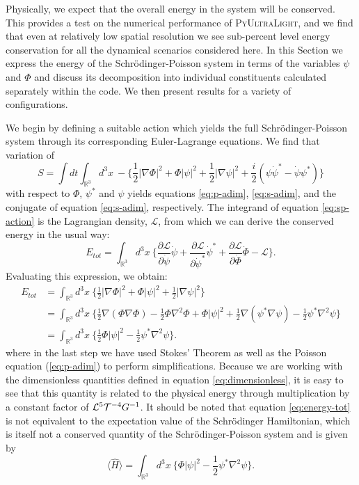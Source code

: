 \documentclass[a4paper,11pt]{article}
\newcommand{\PyUltraLight}{\textsc{PyUltraLight}\xspace}
\begin{document}
Physically, we expect that the overall energy in the system will be conserved. This provides a test on the numerical performance of \PyUltraLight, and we find that even at relatively low spatial resolution we see sub-percent level energy conservation for all the dynamical scenarios considered here. In this Section we express the energy of the Schr{\"o}dinger-Poisson system in terms of the variables  $\psi$ and $\Phi$ and discuss its decomposition into individual constituents calculated separately within the code. We then present results for a variety of configurations. 

We begin by defining a suitable action which yields the full Schr{\"o}dinger-Poisson system through its corresponding Euler-Lagrange equations. We find that variation of
\begin{equation}\label{eq:sp-action}
    S=\int dt\int_{\mathbb{R}^3} d^3x \  -\bigg\{\frac{1}{2}\vert\nabla\Phi\vert^2+\Phi\vert\psi\vert^2+\frac{1}{2}\vert\nabla\psi\vert^2+\frac{i}{2}(\psi\Dot{\psi}^*-\Dot{\psi}\psi^*)\bigg\}
\end{equation}
with respect to $\Phi$, $\psi^*$ and $\psi$ yields equations \ref{eq:p-adim}, \ref{eq:s-adim}, and the conjugate of equation \ref{eq:s-adim}, respectively. The integrand of equation \ref{eq:sp-action} is the Lagrangian density, $\mathcal{L}$, from which we can derive the conserved energy in the usual way:
\begin{equation}
    E_{tot}=\int_{\mathbb{R}^3}d^3x \ \bigg\{\frac{\partial \mathcal{L}}{\partial \Dot{\psi}}\Dot{\psi}+\frac{\partial \mathcal{L}}{\partial \Dot{\psi}^*}\Dot{\psi}^*+\frac{\partial \mathcal{L}}{\partial \Dot{\Phi}}\Dot{\Phi}-\mathcal{L}\bigg\}.
\end{equation}
Evaluating this expression, we obtain:
\begin{align}
    E_{tot}&=\int_{\mathbb{R}^3}d^3x \ \bigg\{\frac{1}{2}\vert\nabla\Phi\vert^2+\Phi\vert\psi\vert^2+\frac{1}{2}\vert\nabla\psi\vert^2\bigg\}\\
    &=\int_{\mathbb{R}^3}d^3x \ \bigg\{\frac{1}{2}\nabla(\Phi\nabla\Phi)-\frac{1}{2}\Phi\nabla^2\Phi+\Phi\vert\psi\vert^2+\frac{1}{2}\nabla(\psi^*\nabla\psi)-\frac{1}{2}\psi^*\nabla^2\psi\bigg\}\\
    &=\int_{\mathbb{R}^3}d^3x \ \bigg\{\frac{1}{2}\Phi\vert\psi\vert^2-\frac{1}{2}\psi^*\nabla^2\psi\bigg\}.\label{eq:energy-tot}
\end{align}
where in the last step we have used Stokes' Theorem as well as the Poisson equation (\ref{eq:p-adim}) to perform simplifications. Because we are working with the dimensionless quantities defined in equation \ref{eq:dimensionless}, it is easy to see that this quantity is related to the physical energy through multiplication by a constant factor of $\CMcal{L}^5\CMcal{T}^{-4}G^{-1}$. It should be noted that equation \ref{eq:energy-tot} is not equivalent to the expectation value of the Schr{\"o}dinger Hamiltonian, which is itself not a conserved quantity of the Schr{\"o}dinger-Poisson system and is given by
\begin{equation}
    \langle\hat{H}\rangle=\int_{\mathbb{R}^3}d^3x \ \bigg\{\Phi\vert\psi\vert^2-\frac{1}{2}\psi^*\nabla^2\psi\bigg\}.
\end{equation}
\end{document}
